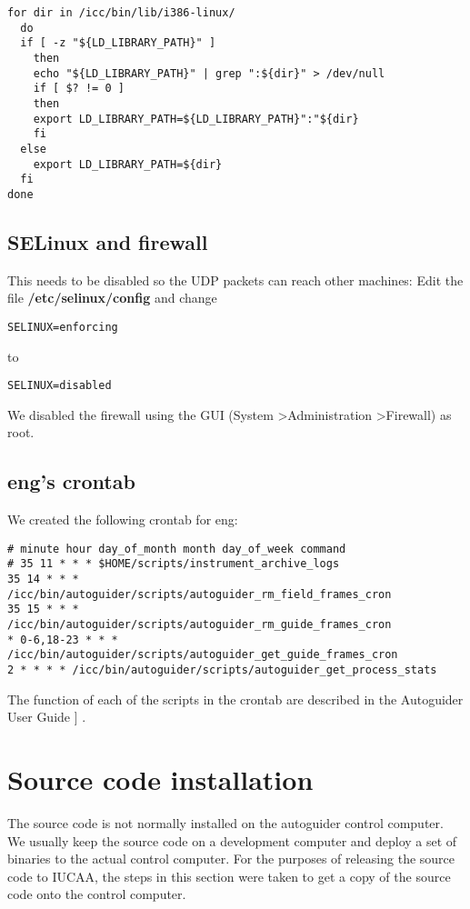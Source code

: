 \documentclass[10pt,a4paper]{article}
\begin{document}
\begin{verbatim}
for dir in /icc/bin/lib/i386-linux/ 
  do
  if [ -z "${LD_LIBRARY_PATH}" ] 
    then
    echo "${LD_LIBRARY_PATH}" | grep ":${dir}" > /dev/null
    if [ $? != 0 ] 
    then
	export LD_LIBRARY_PATH=${LD_LIBRARY_PATH}":"${dir}
    fi
  else
    export LD_LIBRARY_PATH=${dir}
  fi
done
\end{verbatim}

\subsection{SELinux and firewall}

This needs to be disabled so the UDP packets can reach other machines:
Edit the file {\bf /etc/selinux/config} and change

\begin{verbatim}
SELINUX=enforcing
\end{verbatim}

to

\begin{verbatim}
SELINUX=disabled
\end{verbatim}

We disabled the firewall using the GUI (System \textgreater Administration \textgreater Firewall) as root.

\subsection{eng's crontab}

We created the following crontab for eng:
\begin{verbatim}
# minute hour day_of_month month day_of_week command
# 35 11 * * * $HOME/scripts/instrument_archive_logs
35 14 * * * /icc/bin/autoguider/scripts/autoguider_rm_field_frames_cron
35 15 * * * /icc/bin/autoguider/scripts/autoguider_rm_guide_frames_cron
* 0-6,18-23 * * * /icc/bin/autoguider/scripts/autoguider_get_guide_frames_cron
2 * * * * /icc/bin/autoguider/scripts/autoguider_get_process_stats
\end{verbatim}

The function of each of the scripts in the crontab are described in the Autoguider User Guide ]
\cite{bib:autoguideruserguide}.

\section{Source code installation}

The source code is not normally installed on the autoguider control computer. We usually keep the source code on a development computer and deploy a set of binaries to the actual control computer. For the purposes of releasing the source code to IUCAA, the steps in this section were taken to get a copy of the source code onto the control computer.
\end{document}

